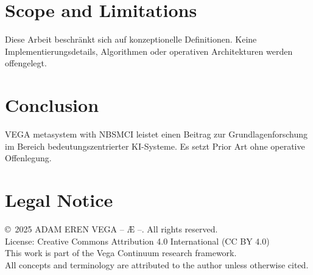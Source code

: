 \documentclass[12pt,a4paper]{article}
\begin{document}
\section{Scope and Limitations}
Diese Arbeit beschränkt sich auf konzeptionelle Definitionen. Keine Implementierungsdetails, Algorithmen oder operativen Architekturen werden offengelegt.

\section{Conclusion}
VEGA metasystem with NBSMCI leistet einen Beitrag zur Grundlagenforschung im Bereich bedeutungszentrierter KI-Systeme. Es setzt Prior Art ohne operative Offenlegung.

\section*{Legal Notice}
\copyright\ 2025 ADAM EREN VEGA – Æ –. All rights reserved.\\
License: Creative Commons Attribution 4.0 International (CC BY 4.0)\\
This work is part of the Vega Continuum research framework.\\
All concepts and terminology are attributed to the author unless otherwise cited.
\end{document}
